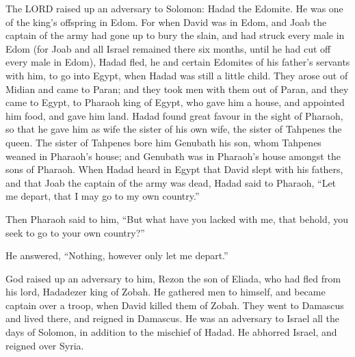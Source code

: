  The LORD raised up an adversary to Solomon: Hadad the
Edomite. He was one of the king's offspring in Edom.  For
when David was in Edom, and Joab the captain of the army had gone up to
bury the slain, and had struck every male in Edom  (for
Joab and all Israel remained there six months, until he had cut off
every male in Edom),  Hadad fled, he and certain Edomites
of his father's servants with him, to go into Egypt, when Hadad was
still a little child.  They arose out of Midian and came
to Paran; and they took men with them out of Paran, and they came to
Egypt, to Pharaoh king of Egypt, who gave him a house, and appointed him
food, and gave him land.  Hadad found great favour in the
sight of Pharaoh, so that he gave him as wife the sister of his own
wife, the sister of Tahpenes the queen.  The sister of
Tahpenes bore him Genubath his son, whom Tahpenes weaned in Pharaoh's
house; and Genubath was in Pharaoh's house amongst the sons of Pharaoh.
 When Hadad heard in Egypt that David slept with his
fathers, and that Joab the captain of the army was dead, Hadad said to
Pharaoh, ``Let me depart, that I may go to my own country.''

 Then Pharaoh said to him, ``But what have you lacked
with me, that behold, you seek to go to your own country?''

He answered, ``Nothing, however only let me depart.''

 God raised up an adversary to him, Rezon the son of
Eliada, who had fled from his lord, Hadadezer king of Zobah.
 He gathered men to himself, and became captain over a
troop, when David killed them of Zobah. They went to Damascus and lived
there, and reigned in Damascus.  He was an adversary to
Israel all the days of Solomon, in addition to the mischief of Hadad. He
abhorred Israel, and reigned over Syria.

